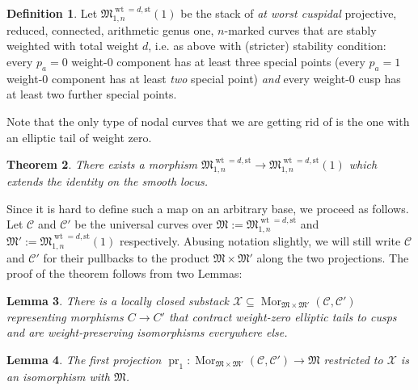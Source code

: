 \documentclass[11pt]{amsart}
\renewcommand{\to}{\rightarrow}
\newcommand{\pr}{\operatorname{pr}}
\theoremstyle{plain}
\newtheorem{thm}{Theorem}[section]
\newtheorem{lem}[thm]{Lemma}
\theoremstyle{definition}
\newtheorem{dfn}[thm]{Definition}
\begin{document}
\begin{dfn}
Let $\mathfrak M_{1,n}^{\operatorname{wt}=d,\text{st}}(1)$ be the stack of \emph{at worst cuspidal} projective, reduced, connected, arithmetic genus one, $n$-marked curves that are stably weighted with total weight $d$, i.e. as above with (stricter) stability condition: every $p_a=0$ weight-0 component has at least three special points (every $p_a=1$ weight-0 component has at least \emph{two} special point) \emph{and} every weight-0 cusp has at least two further special points.
\end{dfn}

Note that the only type of nodal curves that we are getting rid of is the one with an elliptic tail of weight zero.

\begin{thm}
There exists a morphism $\mathfrak M_{1,n}^{\operatorname{wt}=d,\text{st}}\to\mathfrak M_{1,n}^{\operatorname{wt}=d,\text{st}}(1)$ which extends the identity on the smooth locus.
\end{thm} 
Since it is hard to define such a map on an arbitrary base, we proceed as follows. Let $\mathcal C$ and $\mathcal C'$ be the universal curves over $\mathfrak{M}:=\mathfrak M_{1,n}^{\operatorname{wt}=d,\text{st}}$ and $\mathfrak{M}':=\mathfrak M_{1,n}^{\operatorname{wt}=d,\text{st}}(1)$ respectively. Abusing notation slightly, we will still write $\mathcal C$ and $\mathcal C'$ for their pullbacks to the product $\mathfrak{M}\times\mathfrak{M}'$ along the two projections. The proof of the theorem follows from two Lemmas:

\begin{lem}\label{lemma:def_X}
 There is a locally closed substack $\mathcal X\subseteq\operatorname{Mor}_{\mathfrak{M}\times\mathfrak{M}'}(\mathcal C,\mathcal C')$ representing morphisms $C\to C'$ that contract weight-zero elliptic tails to cusps and are weight-preserving isomorphisms everywhere else. 
\end{lem}

\begin{lem}\label{lamma:projection_iso}
 The first projection $\pr_1\colon \operatorname{Mor}_{\mathfrak{M}\times\mathfrak{M}'}(\mathcal C,\mathcal C')\to\mathfrak M$ restricted to $\mathcal X$ is an isomorphism with $\mathfrak M$.
\end{lem}
\end{document}
